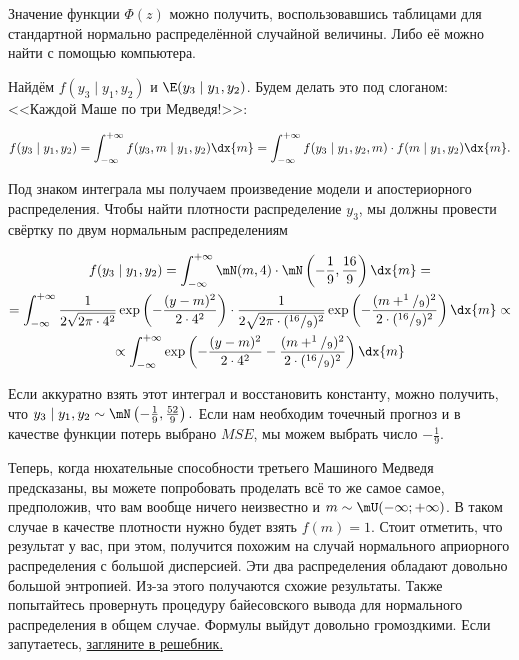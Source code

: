 \documentclass[12pt, a4paper, oneside]{article}
\newcommand{\expp}[1]{ \exp \left( #1 \right)}
\begin{document}
\begin{sol}
Значение функции $\Phi(z)$ можно получить, воспользовавшись таблицами для стандартной нормально распределённой случайной величины. Либо её можно найти с помощью компьютера. 


 Найдём $f(y_3 \mid y_1,y_2)$ и $\E(y_3 \mid y_1,y_2)$. Будем делать это под слоганом: <<Каждой Маше по три Медведя!>>:

\begin{multline*}
f(y_3 \mid y_1,y_2)  = \int_{-\infty}^{+\infty} f(y_3, m \mid y_1,y_2)\dx{m}  = \int_{-\infty}^{+\infty}  f(y_3 \mid y_1,y_2,m) \cdot f(m \mid y_1,y_2) \dx{m}.
\end{multline*}

Под знаком интеграла мы получаем произведение модели и апостериорного распределения. Чтобы найти плотности распределение $y_3$, мы должны провести свёртку по двум нормальным распределениям

\begin{multline*}
f(y_3 \mid y_1,y_2)  = \int_{-\infty}^{+\infty} \mN(m,4)\cdot \mN \left (-\frac{1}{9},\frac{16}{9} \right) \dx{m} = \\ = \int_{-\infty}^{+\infty} 
\frac{1}{2\sqrt{2\pi \cdot 4^2}} \expp{-\frac{(y - m)^2}{2 \cdot 4^2}} \cdot 
\frac{1}{2\sqrt{2\pi \cdot (^{16}/_9)^2}} \expp{-\frac{(m + ^1/_9)^2}{2 \cdot (^{16}/_9)^2}} \dx{m} \propto \\ \propto   \int_{-\infty}^{+\infty}  \expp{-\frac{(y - m)^2}{2 \cdot 4^2} -\frac{(m + ^1/_9)^2}{2 \cdot (^{16}/_9)^2}} \dx{m}  
\end{multline*}

Если аккуратно взять этот интеграл и восстановить константу, можно получить, что $y_3 \mid y_1,y_2 \sim \mN \left(-\frac{1}{9},\frac{52}{9} \right).$ Если нам необходим точечный прогноз и в качестве функции потерь выбрано $MSE$, мы можем выбрать число $-\frac{1}{9}.$

Теперь, когда нюхательные способности третьего Машиного Медведя предсказаны, вы можете попробовать проделать всё то же самое самое, предположив, что вам вообще ничего неизвестно и $m \sim \mU(-\infty; +\infty)$. В таком случае в качестве плотности нужно будет взять $f(m) = 1$. Стоит отметить, что результат у вас, при этом, получится похожим на случай нормального априорного распределения с большой дисперсией. Эти два распределения обладают довольно большой энтропией. Из-за этого получаются схожие результаты. Также попытайтесь провернуть процедуру байесовского вывода для нормального распределения в общем случае. Формулы выйдут довольно громоздкими. Если запутаетесь, \href{https://github.com/FUlyankin/book_about_bayes}{загляните в решебник.}
\end{sol}
\end{document}
